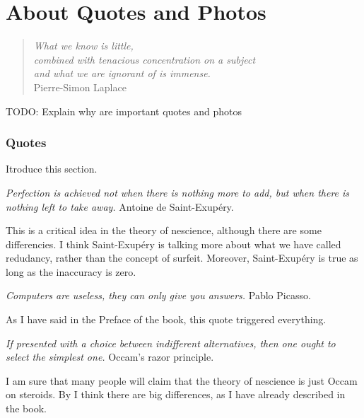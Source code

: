 %
%


\chapter{About Quotes and Photos}
\label{apx:photos}

\begin{quote}
\begin{flushright}
\emph{What we know is little, \\
combined with tenacious concentration on a subject\\
and what we are ignorant of is immense.}\\
Pierre-Simon Laplace
\end{flushright}
\end{quote}
\bigskip

{\color{red} TODO: Explain why are important quotes and photos}

\subsection{Quotes}

{\color{red} Itroduce this section.}

\bigskip

\emph{Perfection is achieved not when there is nothing more to add, but when there is nothing left to take away.} Antoine de Saint-Exupéry.

{\color{red} This is a critical idea in the theory of nescience, although there are some differencies. I think Saint-Exupéry is talking more about what we have called redudancy, rather than the concept of surfeit. Moreover, Saint-Exupéry is true as long as the inaccuracy is zero.}

\bigskip

\emph{Computers are useless, they can only give you answers.} Pablo Picasso.

{\color{red} As I have said in the Preface of the book, this quote triggered everything.}

\bigskip

\emph{If presented with a choice between indifferent alternatives, then one ought to select the simplest one.} Occam’s razor principle.

{\color{red} I am sure that many people will claim that the theory of nescience is just Occam on steroids. By I think there are big differences, as I have already described in the book.}

